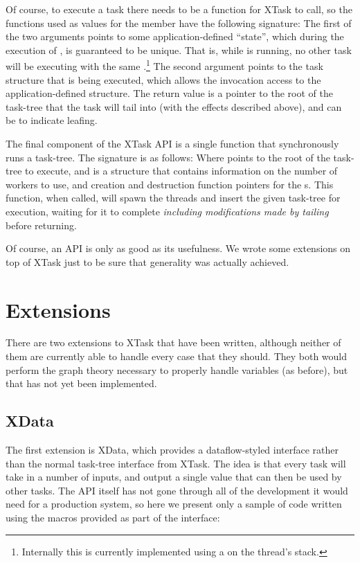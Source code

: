 \documentclass{article}
\begin{document}

Of course, to execute a task there needs to be a function for XTask to call, so the functions used as values for the  member have the following signature:
The first of the two arguments points to some application-defined ``state'', which during the execution of , is guaranteed to be unique. That is, while  is running, no other task will be executing with the same .\footnote{Internally this is currently implemented using a  on the thread's stack.} The second argument points to the task structure that is being executed, which allows the invocation access to the application-defined structure. The return value is a pointer to the root of the task-tree that the task will tail into (with the effects described above), and can be  to indicate leafing.

The final component of the XTask API is a single function that synchronously runs a task-tree. The signature is as follows:
Where  points to the root of the task-tree to execute, and  is a structure that contains information on the number of workers to use, and creation and destruction function pointers for the s. This function, when called, will spawn the threads and insert the given task-tree for execution, waiting for it to complete \textit{including modifications made by tailing} before returning.

Of course, an API is only as good as its usefulness. We wrote some extensions on top of XTask just to be sure that generality was actually achieved.

\section{Extensions}
There are two extensions to XTask that have been written, although neither of them are currently able to handle every case that they should. They both would perform the graph theory necessary to properly handle variables (as before), but that has not yet been implemented.

\subsection{XData}
The first extension is XData, which provides a dataflow-styled interface rather than the normal task-tree interface from XTask. The idea is that every task will take in a number of inputs, and output a single value that can then be used by other tasks. The API itself has not gone through all of the development it would need for a production system, so here we present only a sample of code written using the macros provided as part of the interface:
\end{document}

